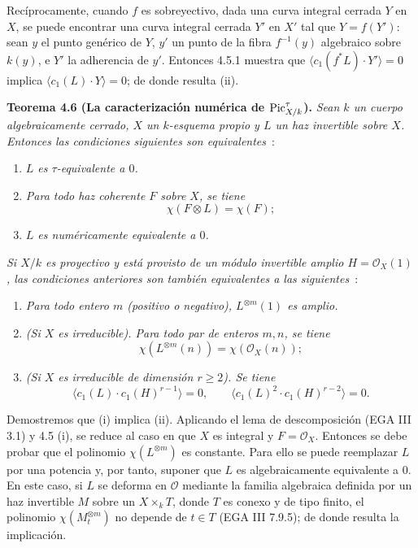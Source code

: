 Recíprocamente, cuando \(f\) es sobreyectivo, dada una curva integral cerrada
\(Y\) en \(X\), se puede encontrar una curva integral cerrada \(Y'\) en
\(X'\) tal que \(Y=f(Y')\): sean \(y\) el punto genérico de \(Y\), \(y'\) un
punto de la fibra \(f^{-1}(y)\) algebraico sobre \(k(y)\), e \(Y'\) la
adherencia de \(y'\). Entonces 4.5.1 muestra que
\(\langle c_1(f^*L)\cdot Y'\rangle=0\) implica
\(\langle c_1(L)\cdot Y\rangle=0\); de donde resulta (ii).

\textbf{Teorema 4.6 (La caracterización numérica de
\(\operatorname{Pic}^\tau_{X/k}\)).} \emph{Sean \(k\) un cuerpo algebraicamente cerrado,
\(X\) un \(k\)-esquema propio y \(L\) un haz invertible sobre \(X\). Entonces
las condiciones siguientes son equivalentes}~:
\begin{enumerate}[label=(\roman*)]
\item \emph{\(L\) es \(\tau\)-equivalente a \(0\).}
\item \emph{Para todo haz coherente \(F\) sobre \(X\), se tiene}
\[
  \chi(F\otimes L)=\chi(F);
\]
\item \emph{\(L\) es numéricamente equivalente a \(0\).}
\end{enumerate}
\emph{Si \(X/k\) es proyectivo y está provisto de un módulo invertible
amplio \(H=\mathcal O_X(1)\), las condiciones anteriores son también
equivalentes a las siguientes}~:
\begin{enumerate}[label=(\roman*),start=4]
\item \emph{Para todo entero \(m\) (positivo o negativo),
\(L^{\otimes m}(1)\) es amplio.}
\item \emph{(Si \(X\) es irreducible). Para todo par de enteros \(m,n\), se
tiene}
\[
  \chi(L^{\otimes m}(n))=\chi(\mathcal O_X(n));
\]
\item \emph{(Si \(X\) es irreducible de dimensión \(r\ge2\)). Se tiene}
\[
  \langle c_1(L)\cdot c_1(H)^{r-1}\rangle=0,\qquad
  \langle c_1(L)^2\cdot c_1(H)^{r-2}\rangle=0.
\]
\end{enumerate}

Demostremos que (i) implica (ii). Aplicando el lema de descomposición (EGA
III 3.1) y 4.5 (i), se reduce al caso en que \(X\) es integral y
\(F=\mathcal O_X\). Entonces se debe probar que el polinomio
\(\chi(L^{\otimes m})\) es constante. Para ello se puede reemplazar \(L\) por
una potencia y, por tanto, suponer que \(L\) es algebraicamente equivalente a
\(0\). En este caso, si \(L\) se deforma en \(\mathcal O\) mediante la familia
algebraica definida por un haz invertible \(M\) sobre un \(X\times_kT\), donde
\(T\) es conexo y de tipo finito, el polinomio
\(\chi(M_t^{\otimes m})\) no depende de \(t\in T\) (EGA III 7.9.5); de donde
resulta la implicación.

